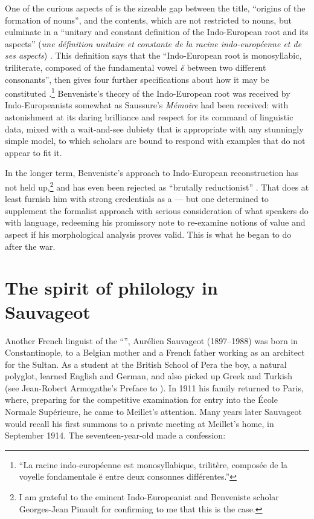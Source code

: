 \documentclass[output=paper]{langscibook}
\begin{document}
One of the curious aspects of \citet{Benveniste1935} is the sizeable gap between the title, ``origins of the formation of nouns'', and the contents, which are not restricted to nouns, but culminate in a ``unitary and constant definition of the Indo-European root and its aspects'' (\emph{une définition unitaire et constante de la racine indo-européenne et de ses aspects}) \citep[170]{Benveniste1935}. This definition says that the ``Indo-European root is monosyllabic, triliterate, composed of the fundamental vowel \emph{ĕ} between two different consonants'', then gives four further specifications about how it may be constituted \citep[170--171]{Benveniste1935}.\footnote{``La racine indo-européenne est monosyllabique, trilitère, composée de la voyelle fondamentale ĕ entre deux consonnes différentes.''} Benveniste's theory of the Indo-European root was received by Indo-Europeanists somewhat as Saussure's \emph{Mémoire} had been received: with astonishment at its daring brilliance and respect for its command of linguistic data, mixed with a wait-and-see dubiety that is appropriate with any stunningly simple model, to which scholars are bound to respond with examples that do not appear to fit it.

\largerpage[1]In the longer term, Benveniste's approach to Indo-European reconstruction has not held up,\footnote{I am grateful to the eminent Indo-Europeanist and Benveniste scholar Georges-Jean Pinault for confirming to me that this is the case.} and has even been rejected as ``brutally reductionist'' \citep[560]{Dunkel1981}. That does at least furnish him with strong credentials as a  — but one determined to supplement the formalist approach with serious consideration of what speakers do with language, redeeming his \citeyear{Benveniste1935} promissory note to re-examine notions of value and aspect if his morphological analysis proves valid. This is what he began to do after the war.

\section{The spirit of philology in Sauvageot}
\label{sec:joseph:sauvageot}

Another French linguist of the ``'', Aurélien Sauvageot (1897--1988) was born in Constantinople, to a Belgian mother and a French father working as an architect for the Sultan. As a student at the British School of Pera the boy, a natural polyglot, learned English and German, and also picked up Greek and Turkish (see Jean-Robert Armogathe's Preface to \citealt[9]{Sauvageot2013}). In 1911 his family returned to Paris, where, preparing for the competitive examination for entry into the École Normale Supérieure, he came to Meillet's attention. Many years later Sauvageot would recall his first summons to a private meeting at Meillet's home, in September 1914. The seventeen-year-old made a confession:
\end{document}
